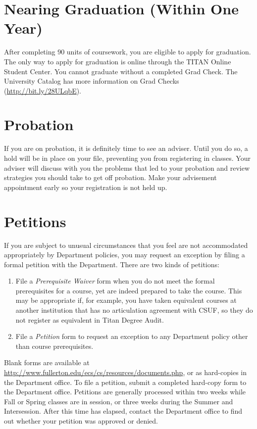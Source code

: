 \documentclass{book}
\newcommand{\CampusName}{CSUF}
\begin{document}
\section{Nearing Graduation (Within One Year)}
After completing 90 units of coursework, you are eligible to apply for graduation. The only way to apply for graduation is online through the TITAN Online Student Center. You cannot graduate without a completed Grad Check.  The University Catalog has more information on Grad Checks (\url{http://bit.ly/28ULqbE}).

\section{Probation}
If you are on probation, it is definitely time to see an adviser. Until you do so, a hold will be in place on your file, preventing you from registering in classes. Your adviser will discuss with you the problems that led to your probation and review strategies you should take to get off probation. Make your advisement appointment early so your registration is not held up.

\section{Petitions}
\label{section:petitions}


If you are subject to unusual circumstances that you feel are not accommodated appropriately by Department policies, you may request an exception by filing a formal petition with the Department. There are two kinds of petitions:
\begin{enumerate}
\item File a \emph{Prerequisite Waiver} form when you do not meet the formal prerequisites for a course, yet are indeed prepared to take the course. This may be appropriate if, for example, you have taken equivalent courses at another institution that has no articulation agreement with \CampusName, so they do not register as equivalent in Titan Degree Audit.
\item File a \emph{Petition} form to request an exception to any Department policy other than course prerequisites.
\end{enumerate}

Blank forms are available at \url{http://www.fullerton.edu/ecs/cs/resources/documents.php}, or as hard-copies in the Department office. To file a petition, submit a completed hard-copy form to the Department office. Petitions are generally processed within two weeks while Fall or Spring classes are in session, or three weeks during the Summer and Intersession. After this time has elapsed, contact the Department office to find out whether your petition was approved or denied.
\end{document}
